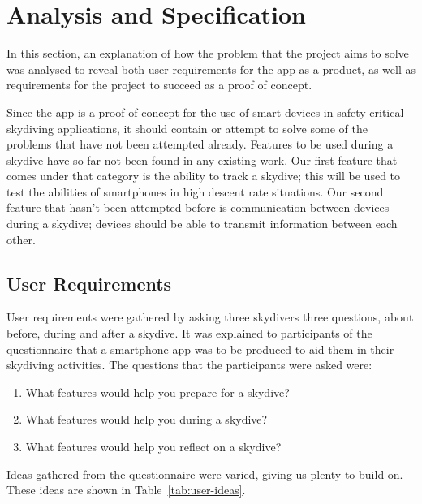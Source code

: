 \section{Analysis and Specification}\label{sec:analysis-and-spec}
In this section, an explanation of how the problem that the project aims to solve was analysed to reveal both user requirements for the app as a product, as well as requirements for the project to succeed as a proof of concept.

Since the app is a proof of concept for the use of smart devices in safety-critical skydiving applications, it should contain or attempt to solve some of the problems that have not been attempted already. Features to be used during a skydive have so far not been found in any existing work. Our first feature that comes under that category is the ability to track a skydive; this will be used to test the abilities of smartphones in high descent rate situations. Our second feature that hasn't been attempted before is communication between devices during a skydive; devices should be able to transmit information between each other.

\subsection{User Requirements}
User requirements were gathered by asking three skydivers three questions, about before, during and after a skydive. It was explained to participants of the questionnaire that a smartphone app was to be produced to aid them in their skydiving activities. The questions that the participants were asked were:
\begin{enumerate}
  \item{What features would help you prepare for a skydive?}
  \item{What features would help you during a skydive?}
  \item{What features would help you reflect on a skydive?}
\end{enumerate}

Ideas gathered from the questionnaire were varied, giving us plenty to build on. These ideas are shown in Table~\vref{tab:user-ideas}.

